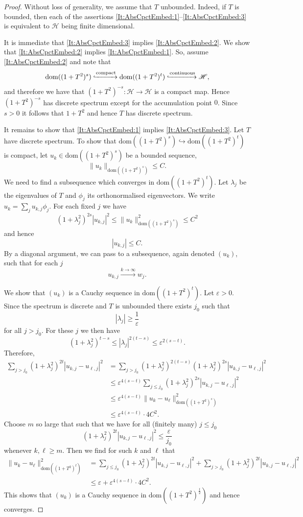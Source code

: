 \documentclass[a4paper,10pt,reqno]{amsart}
\newcommand{\Hil}{\mathscr{H}}
\newcommand{\embed}{\hookrightarrow}%
\newcommand{\dom}{\mathrm{dom}}
\renewcommand{\epsilon}{\varepsilon}
\theoremstyle{definition}
\begin{document}
\begin{proof}
Without loss of generality, we assume that $T$ unbounded.
Indeed, if $T$ is bounded, then each of the assertions \ref{It:AbsCpctEmbed:1}--\ref{It:AbsCpctEmbed:3} is equivalent to $\Hil$ being finite dimensional.

It is immediate that \ref{It:AbsCpctEmbed:3} implies \ref{It:AbsCpctEmbed:2}.
We show that \ref{It:AbsCpctEmbed:2} implies \ref{It:AbsCpctEmbed:1}.
So, assume \ref{It:AbsCpctEmbed:2} and note that 
$$ 
\dom((1+T^2)^s) \xhookrightarrow{\mathrm{compact}} \dom((1+T^2)^t) \xhookrightarrow{\mathrm{continuous}} \Hil,
$$
and therefore we have that $(1+T^2)^{-s}:\Hil \to \Hil$ is a compact map.
Hence $(1+T^2)^{-s}$ has discrete spectrum except for the accumulation point $0$.
Since $s>0$ it follows that $1+T^2$ and hence $T$ has discrete spectrum.

It remains to show that \ref{It:AbsCpctEmbed:1} implies \ref{It:AbsCpctEmbed:3}.
Let $T$ have discrete spectrum.
To show that $\dom((1+T^2)^s) \embed \dom((1+T^2)^t)$ is compact, let $u_k\in \dom((1+T^2)^s)$ be a bounded sequence, 
$$
\|u_k\|_{\dom((1 +T^2)^s)} \leq C.
$$
We need to find a subsequence which converges in $\dom((1 +T^2)^t)$.
Let $\lambda_j$ be the eigenvalues of $T$ and $\phi_j$ its orthonormalised eigenvectors.
We write $u_k = \sum_j u_{k,j}\phi_j$.
For each fixed $j$ we have
$$
(1+\lambda_j^2)^{2s} |u_{k,j}|^2 \le \|u_k\|_{\dom((1 +T^2)^s)}^2 \le C^2
$$
and hence 
$$
|u_{k,j}| \le C .
$$
By a diagonal argument, we can pass to a subsequence, again denoted $(u_k)$, such that for each $j$
$$
u_{k,j} \xrightarrow{k\to\infty} w_j .
$$

We show that $(u_k)$ is a Cauchy sequence in $\dom((1 +T^2)^t)$.
Let $\epsilon>0$.
Since the spectrum is discrete and $T$ is unbounded there exists $j_0$ such that 
$$
|\lambda_j| \ge \frac1\epsilon 
$$
for all $j> j_0$.
For these $j$ we then have
$$
(1+\lambda_j^2)^{t-s}
\le 
|\lambda_j|^{2(t-s)}
\le
\epsilon^{2(s-t)}.
$$
Therefore,
\begin{align*}
\sum_{j> j_0} (1+\lambda_j^2)^{2t} |u_{k,j}-u_{\ell,j}|^2
&=
\sum_{j> j_0} (1+\lambda_j^2)^{2(t-s)}(1+\lambda_j^2)^{2s} |u_{k,j}-u_{\ell,j}|^2 \\
&\le
\epsilon^{4(s-t)}\sum_{j\le j_0}(1+\lambda_j^2)^{2s} |u_{k,j}-u_{\ell,j}|^2 \\
&\le
\epsilon^{4(s-t)} \|u_k-u_\ell\|_{\dom((1 +T^2)^s)}^2 \\
&\le
\epsilon^{4(s-t)} \cdot 4C^2.
\end{align*}
Choose $m$ so large that such that we have for all (finitely many) $j\le j_0$
$$
(1+\lambda_j^2)^{2t} |u_{k,j}-u_{\ell,j}|^2 \le \frac{\epsilon}{j_0}
$$
whenever $k,\ell\ge m$.
Then we find for such $k$ and $\ell$ that
\begin{align*}
\|u_k-u_\ell\|_{\dom((1 +T^2)^t)}^2
&=
\sum_{j\le j_0}(1+\lambda_j^2)^{2t} |u_{k,j}-u_{\ell,j}|^2
+ \sum_{j> j_0}(1+\lambda_j^2)^{2t} |u_{k,j}-u_{\ell,j}|^2 \\
&\le
\epsilon + \epsilon^{4(s-t)} \cdot 4C^2.
\end{align*}
This shows that $(u_k)$ is a Cauchy sequence in $\dom((1 +T^2)^{\frac t 2})$ and hence converges.
\end{proof} 
\end{document}
